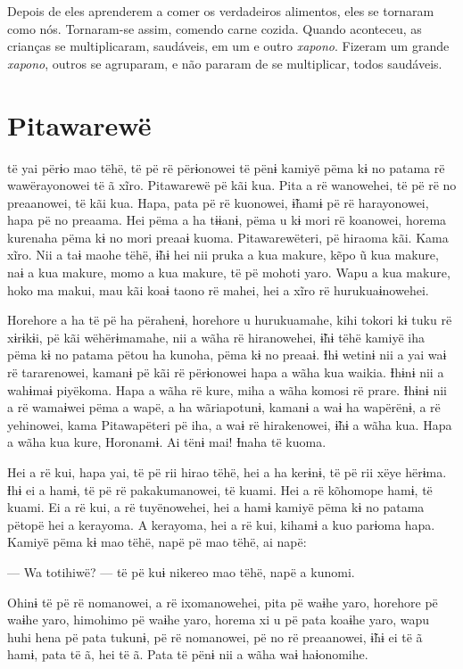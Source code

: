 Depois de eles aprenderem a comer os verdadeiros alimentos, eles se
tornaram como nós. Tornaram-se assim, comendo carne cozida. Quando
aconteceu, as crianças se multiplicaram, saudáveis, em um e outro
\textit{xapono}. Fizeram um grande \textit{xapono}, outros se agruparam, e não
pararam de se multiplicar, todos saudáveis.

\chapter{Pitawarewë}

 të yai përɨo mao tëhë, të pë rë përɨonowei të pënɨ kamiyë pëma
kɨ no patama rë wawërayonowei të ã xĩro. Pitawarewë pë kãi kua. Pita a
rë wanowehei, të pë rë no preaanowei, të kãi kua. Hapa, pata pë rë
kuonowei, ɨ̃hamɨ pë rë harayonowei, hapa pë no preaama. Hei pëma a ha
tɨɨanɨ, pëma u kɨ mori rë koanowei, horema kurenaha pëma kɨ no mori
preaaɨ kuoma. Pitawarewëteri, pë hiraoma kãi. Kama xĩro. Nii a taɨ maohe
tëhë, ɨ̃hɨ hei nii pruka a kua makure, kẽpo ũ kua makure, naɨ a kua
makure, momo a kua makure, të pë mohoti yaro. Wapu a kua makure, hoko ma
makui, mau kãi koaɨ taono rë mahei, hei a xĩro rë hurukuaɨnowehei. 

Horehore a ha të pë ha përahenɨ, horehore u hurukuamahe, kihi tokori kɨ
 tuku rë xɨrɨkɨi, pë kãi wëhërɨmamahe, nii a wãha rë hiranowehei, ɨ̃hɨ
 tëhë kamiyë iha pëma kɨ no patama pëtou ha kunoha, pëma kɨ no preaaɨ.
 Ɨhɨ wetinɨ nii a yai waɨ rë tararenowei, kamanɨ pë kãi rë përɨonowei
 hapa a wãha kua waikia. Ɨhɨnɨ nii a wahɨmaɨ piyëkoma. Hapa a wãha rë
 kure, miha a wãha komosi rë prare. Ɨhɨnɨ nii a rë wamaɨwei pëma a wapë,
 a ha wãriapotunɨ, kamanɨ a waɨ ha wapërënɨ, a rë yehinowei, kama
 Pitawapëteri pë iha, a waɨ rë hirakenowei, ɨ̃hɨ a wãha kua. Hapa a wãha
 kua kure, Horonamɨ. Ai tënɨ mai! Ɨnaha të kuoma. 

Hei a rë kui, hapa yai, të pë rii hirao tëhë, hei a ha kerɨnɨ, të pë rii
xëye hërɨma. Ɨhɨ ei a hamɨ, të pë rë pakakumanowei, të kuami. Hei a rë
kõhomope hamɨ, të kuami. Ei a rë kui, a rë tuyënowehei, hei a hamɨ
kamiyë pëma kɨ no patama pëtopë hei a kerayoma. A kerayoma, hei a rë
kui, kihamɨ a kuo parɨoma hapa. Kamiyë pëma kɨ mao tëhë, napë pë mao
tëhë, ai napë:

--- Wa totihiwë? --- të pë kuɨ nikereo mao tëhë, napë a kunomi.

Ohinɨ të pë rë nomanowei, a rë ixomanowehei, pita pë waɨhe yaro,
horehore pë waɨhe yaro, himohimo pë waɨhe yaro, horema xi u pë pata
koaɨhe yaro, wapu huhi hena pë pata tukunɨ, pë rë nomanowei, pë no rë
preaanowei, ɨ̃hɨ ei të ã hamɨ, pata të ã, hei të ã. Pata të pënɨ nii a
wãha waɨ haɨonomihe. 

